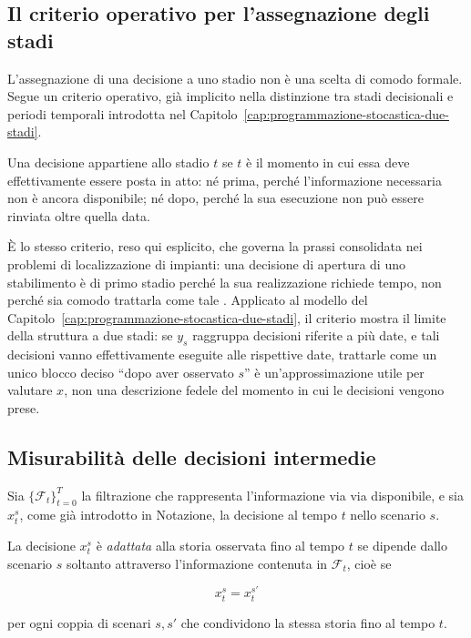\subsection{Il criterio operativo per l'assegnazione degli stadi}

L'assegnazione di una decisione a uno stadio non \`e una scelta di comodo
formale. Segue un criterio operativo, gi\`a implicito nella distinzione tra
stadi decisionali e periodi temporali introdotta nel
Capitolo~\ref{cap:programmazione-stocastica-due-stadi}.

\begin{criterion}

\label{crit:cap15-assegnazione-stadio}

Una decisione appartiene allo stadio $t$ se $t$ \`e il momento in cui essa
deve effettivamente essere posta in atto: n\'e prima, perch\'e l'informazione
necessaria non \`e ancora disponibile; n\'e dopo, perch\'e la sua esecuzione
non pu\`o essere rinviata oltre quella data.

\end{criterion}

\`E lo stesso criterio, reso qui esplicito, che governa la prassi consolidata
nei problemi di localizzazione di impianti: una decisione di apertura di uno
stabilimento \`e di primo stadio perch\'e la sua realizzazione richiede
tempo, non perch\'e sia comodo trattarla come tale \cite{BirgeLouveaux}.
Applicato al modello del Capitolo~\ref{cap:programmazione-stocastica-due-stadi},
il criterio mostra il limite della struttura a due stadi: se $y_s$ raggruppa
decisioni riferite a pi\`u date, e tali decisioni vanno effettivamente
eseguite alle rispettive date, trattarle come un unico blocco deciso ``dopo
aver osservato $s$'' \`e un'approssimazione utile per valutare $x$, non una
descrizione fedele del momento in cui le decisioni vengono prese.

\subsection{Misurabilit\`a delle decisioni intermedie}

Sia $\{\mathcal F_t\}_{t=0}^T$ la filtrazione che rappresenta l'informazione
via via disponibile, e sia $x_t^s$, come gi\`a introdotto in Notazione, la
decisione al tempo $t$ nello scenario $s$.

\begin{definition}

\label{def:cap15-decisione-adattata}

La decisione $x_t^s$ \`e \emph{adattata} alla storia osservata fino al tempo
$t$ se dipende dallo scenario $s$ soltanto attraverso l'informazione
contenuta in $\mathcal F_t$, cio\`e se

\[
x_t^s=x_t^{s'}
\]

per ogni coppia di scenari $s,s'$ che condividono la stessa storia fino al
tempo $t$.

\end{definition}

